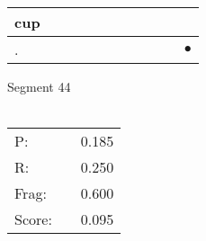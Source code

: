 \documentclass[landscape]{article}
\newcommand{\ssp}{\hspace{2pt}}
\newcommand{\mex}{\cellcolor{g}$\bullet$}
\begin{document}
\begin{tabular}{|l|p{10pt}|p{10pt}|p{10pt}|p{10pt}|p{10pt}|p{10pt}|p{10pt}|p{10pt}|p{10pt}|p{10pt}|}
\hline
\ssp cup \ssp&\hspace{2pt}&\hspace{2pt}&\hspace{2pt}&\hspace{2pt}&\hspace{2pt}&\hspace{2pt}&\hspace{2pt}&\hspace{2pt}&\hspace{2pt}&\hspace{2pt}\\
\hline
\ssp \cellcolor{ref9}. \ssp&\hspace{2pt}&\hspace{2pt}&\hspace{2pt}&\hspace{2pt}&\hspace{2pt}&\hspace{2pt}&\hspace{2pt}&\hspace{2pt}&\hspace{2pt}&\hspace{2pt}\mex\\
\hline
\end{tabular}

\vspace{6pt}
\noindent Segment 44\\\\
\noindent\begin{tabular}{lm{12pt}r}
\hline
P:&&0.185\\
R:&&0.250\\
Frag:&&0.600\\
Score:&&0.095\\
\end{tabular}

\newpage
\end{document}
